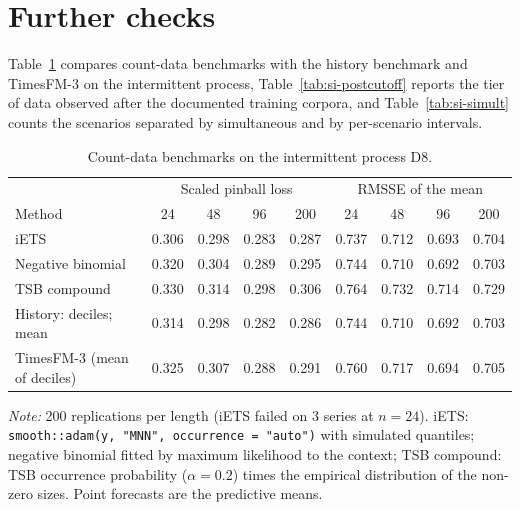 \documentclass[ASNA]{USG}
\providecommand{\code}[1]{\texttt{#1}}
\providecommand{\tableref}[1]{Table~\ref{#1}}
\begin{document}
\section{Further checks}
\label{si:further}

\tableref{tab:si-count} compares count-data benchmarks with the history benchmark and TimesFM-3 on the
intermittent process, \tableref{tab:si-postcutoff} reports the tier of data observed after the documented
training corpora, and \tableref{tab:si-simult} counts the scenarios separated by simultaneous and by
per-scenario intervals.

\begin{table}[!htbp]
\centering
\begin{threeparttable}
\caption{Count-data benchmarks on the intermittent process D8.}
\label{tab:si-count}
\footnotesize\setlength{\tabcolsep}{4pt}
\begin{tabular}{lcccccccc}
\toprule
& \multicolumn{4}{c}{Scaled pinball loss} & \multicolumn{4}{c}{RMSSE of the mean} \\
Method & 24 & 48 & 96 & 200 & 24 & 48 & 96 & 200 \\
\midrule
iETS & 0.306 & 0.298 & 0.283 & 0.287 & 0.737 & 0.712 & 0.693 & 0.704 \\
Negative binomial & 0.320 & 0.304 & 0.289 & 0.295 & 0.744 & 0.710 & 0.692 & 0.703 \\
TSB compound & 0.330 & 0.314 & 0.298 & 0.306 & 0.764 & 0.732 & 0.714 & 0.729 \\
History: deciles; mean & 0.314 & 0.298 & 0.282 & 0.286 & 0.744 & 0.710 & 0.692 & 0.703 \\
TimesFM-3 (mean of deciles) & 0.325 & 0.307 & 0.288 & 0.291 & 0.760 & 0.717 & 0.694 & 0.705 \\
\bottomrule
\end{tabular}
\begin{tablenotes}[flushleft]\footnotesize
\item \textit{Note:} 200 replications per length (iETS failed on 3 series at $n = 24$). iETS: \code{smooth::adam(y, "MNN", occurrence = "auto")} with simulated quantiles; negative binomial fitted by maximum likelihood to the context; TSB compound: TSB occurrence probability ($\alpha = 0.2$) times the empirical distribution of the non-zero sizes. Point forecasts are the predictive means.
\end{tablenotes}
\end{threeparttable}
\end{table}
\end{document}
